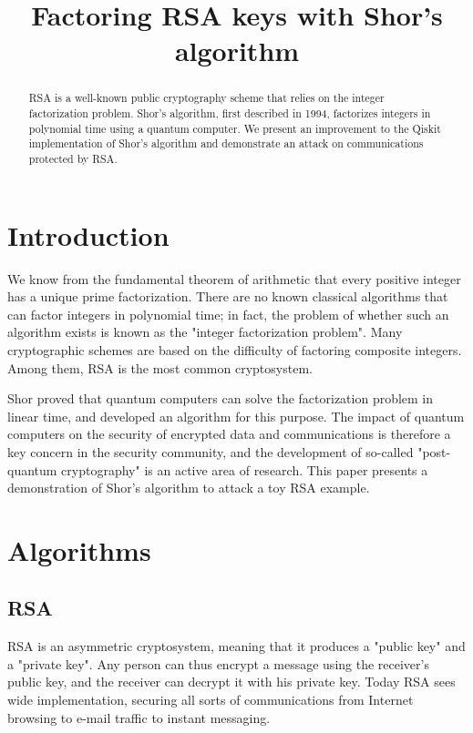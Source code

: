 \documentclass[conference]{IEEEtran}
\begin{document}
\title{Factoring RSA keys with Shor's algorithm}

\author{}

\maketitle

\begin{abstract}
RSA is a well-known public cryptography scheme that relies on the integer factorization problem. Shor's algorithm, first described in 1994, factorizes integers in polynomial time using a quantum computer. We present an improvement to the Qiskit implementation of Shor's algorithm and demonstrate an attack on communications protected by RSA.
\end{abstract}

\section{Introduction}
We know from the fundamental theorem of arithmetic that every positive integer has a unique prime factorization. There are no known classical algorithms that can factor integers in polynomial time; in fact, the problem of whether such an algorithm exists is known as the "integer factorization problem". Many cryptographic schemes are based on the difficulty of factoring composite integers. Among them, RSA is the most common cryptosystem.

Shor proved \cite{shor} that quantum computers can solve the factorization problem in linear time, and developed an algorithm for this purpose. The impact of quantum computers on the security of encrypted data and communications is therefore a key concern in the security community, and the development of so-called "post-quantum cryptography" is an active area of research. This paper presents a demonstration of Shor's algorithm to attack a toy RSA example.

\section{Algorithms}
\subsection{RSA}
RSA is an asymmetric cryptosystem, meaning that it produces a "public key" and a "private key". Any person can thus encrypt a message using the receiver's public key, and the receiver can decrypt it with his private key. Today RSA sees wide implementation, securing all sorts of communications from Internet browsing to e-mail traffic to instant messaging.
\end{document}
